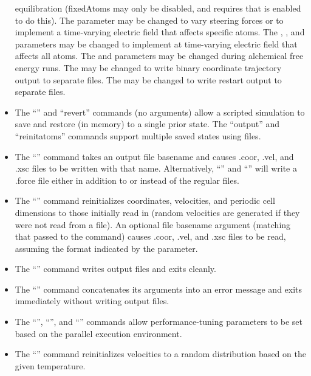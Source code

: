 \begin{itemize}
    equilibration (fixedAtoms may only be disabled, and requires that
     is enabled to do this).
    The  parameter may be changed to vary steering forces
    or to implement a time-varying electric field that affects specific atoms.
    The , , and
     parameters may be changed to implement
    at time-varying electric field that affects all atoms.
    The  and 
    parameters may be changed during alchemical free energy runs.
    The  may be changed to write binary coordinate trajectory
    output to separate files.
    The  may be changed to write restart output to separate files.
 \item The ``'' and ``revert'' commands (no arguments) allow
    a scripted simulation to save and restore (in memory) to a single prior state.
    The ``output'' and ``reinitatoms'' commands support multiple saved states using files.
 \item The ``'' command takes an output file basename and causes
    .coor, .vel, and .xsc files to be written with that name.
    Alternatively, ``'' and
    ``'' will write a .force file
    either in addition to or instead of the regular files.
 \item The ``'' command reinitializes coordinates,
    velocities, and periodic cell dimensions to those initially read in
    (random velocities are generated if they were not read from a file).
    An optional file basename argument (matching that passed to the  command)
    causes .coor, .vel, and .xsc files to be read,
    assuming the format indicated by the  parameter.
 \item The ``'' command writes output files and exits cleanly.
 \item The ``'' command concatenates its arguments into
    an error message and exits immediately without writing output files.
 \item The ``'', ``'', and
    ``'' commands allow performance-tuning
    parameters to be set based on the parallel execution environment.
 \item The ``'' command reinitializes velocities to a
    random distribution based on the given temperature.

\end{itemize}
